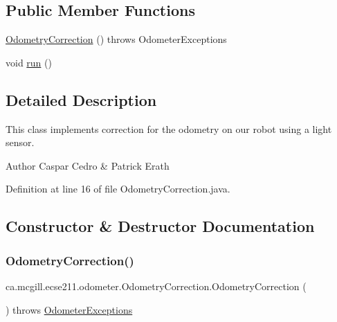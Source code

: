 \subsection*{Public Member Functions}
\begin{DoxyCompactItemize}
\item 
\hyperlink{classca_1_1mcgill_1_1ecse211_1_1odometer_1_1_odometry_correction_ad80b45e0bc4bf935494e075edcec739c}{Odometry\+Correction} ()  throws Odometer\+Exceptions 
\item 
void \hyperlink{classca_1_1mcgill_1_1ecse211_1_1odometer_1_1_odometry_correction_aad66a7030ac00f3a9cbe7bc33c25acbf}{run} ()
\end{DoxyCompactItemize}


\subsection{Detailed Description}
This class implements correction for the odometry on our robot using a light sensor.

\begin{DoxyAuthor}{Author}
Caspar Cedro \& Patrick Erath 
\end{DoxyAuthor}


Definition at line 16 of file Odometry\+Correction.\+java.



\subsection{Constructor \& Destructor Documentation}
\mbox{\label{classca_1_1mcgill_1_1ecse211_1_1odometer_1_1_odometry_correction_ad80b45e0bc4bf935494e075edcec739c}} 
\subsubsection{\texorpdfstring{Odometry\+Correction()}{OdometryCorrection()}}
{\footnotesize\ttfamily ca.\+mcgill.\+ecse211.\+odometer.\+Odometry\+Correction.\+Odometry\+Correction (\begin{DoxyParamCaption}{ }\end{DoxyParamCaption}) throws \hyperlink{classca_1_1mcgill_1_1ecse211_1_1odometer_1_1_odometer_exceptions}{Odometer\+Exceptions}}

